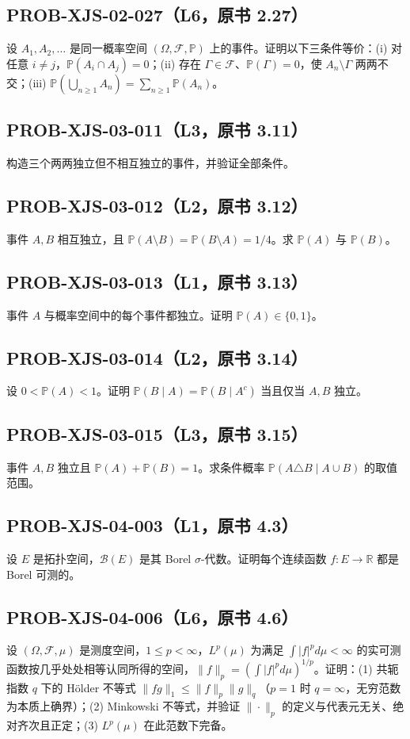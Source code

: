 \documentclass[UTF8]{ctexart}
\begin{document}
\subsection*{PROB-XJS-02-027（L6，原书 2.27）}
设 $A_1,A_2,\ldots$ 是同一概率空间 $(\Omega,\mathcal F,\mathbb P)$ 上的事件。证明以下三条件等价：(i) 对任意 $i\ne j$，$\mathbb P(A_i\cap A_j)=0$；(ii) 存在 $\Gamma\in\mathcal F$、$\mathbb P(\Gamma)=0$，使 $A_n\setminus\Gamma$ 两两不交；(iii) $\mathbb P(\bigcup_{n\ge1}A_n)=\sum_{n\ge1}\mathbb P(A_n)$。

\subsection*{PROB-XJS-03-011（L3，原书 3.11）}
构造三个两两独立但不相互独立的事件，并验证全部条件。

\subsection*{PROB-XJS-03-012（L2，原书 3.12）}
事件 $A,B$ 相互独立，且 $\mathbb P(A\setminus B)=\mathbb P(B\setminus A)=1/4$。求 $\mathbb P(A)$ 与 $\mathbb P(B)$。

\subsection*{PROB-XJS-03-013（L1，原书 3.13）}
事件 $A$ 与概率空间中的每个事件都独立。证明 $\mathbb P(A)\in\{0,1\}$。

\subsection*{PROB-XJS-03-014（L2，原书 3.14）}
设 $0<\mathbb P(A)<1$。证明 $\mathbb P(B\mid A)=\mathbb P(B\mid A^c)$ 当且仅当 $A,B$ 独立。

\subsection*{PROB-XJS-03-015（L3，原书 3.15）}
事件 $A,B$ 独立且 $\mathbb P(A)+\mathbb P(B)=1$。求条件概率 $\mathbb P(A\triangle B\mid A\cup B)$ 的取值范围。

\subsection*{PROB-XJS-04-003（L1，原书 4.3）}
设 $E$ 是拓扑空间，$\mathcal B(E)$ 是其 Borel $\sigma$-代数。证明每个连续函数 $f:E\to\mathbb R$ 都是 Borel 可测的。

\subsection*{PROB-XJS-04-006（L6，原书 4.6）}
设 $(\Omega,\mathcal F,\mu)$ 是测度空间，$1\le p<\infty$，$L^p(\mu)$ 为满足 $\int |f|^p d\mu<\infty$ 的实可测函数按几乎处处相等认同所得的空间，$\|f\|_p=(\int |f|^p d\mu)^{1/p}$。证明：(1) 共轭指数 $q$ 下的 Hölder 不等式 $\|fg\|_1\le\|f\|_p\|g\|_q$（$p=1$ 时 $q=\infty$，无穷范数为本质上确界）；(2) Minkowski 不等式，并验证 $\|\cdot\|_p$ 的定义与代表元无关、绝对齐次且正定；(3) $L^p(\mu)$ 在此范数下完备。
\end{document}
